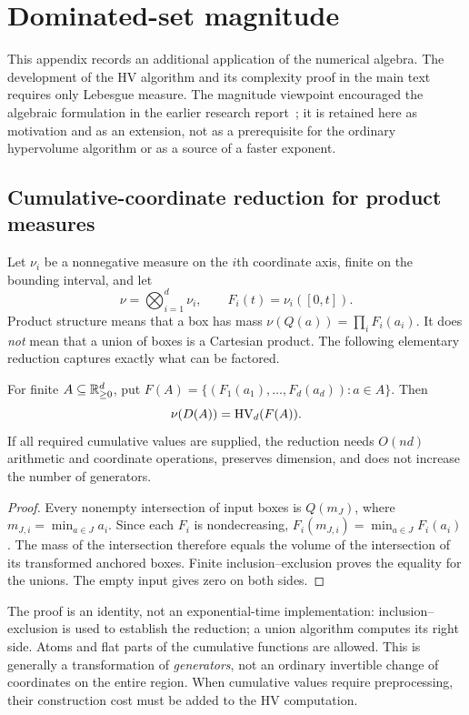 \section{Dominated-set magnitude}
\label{app:magnitude}

This appendix records an additional application of the numerical algebra.
The development of the HV algorithm and its complexity proof in the main
text requires only Lebesgue measure. The magnitude viewpoint encouraged
the algebraic formulation in the earlier research report~\cite{magnitudesoftware};
it is retained here as motivation and as an extension, not as a prerequisite
for the ordinary hypervolume algorithm or as a source of a faster exponent.

\subsection{Cumulative-coordinate reduction for product measures}
Let $\nu_i$ be a nonnegative measure on the $i$th coordinate axis, finite
on the bounding interval, and let
\[
 \nu=\bigotimes_{i=1}^d\nu_i,
 \qquad F_i(t)=\nu_i([0,t]).
\]
Product structure means that a box has mass
$\nu(Q(a))=\prod_iF_i(a_i)$. It does \emph{not} mean that a union of boxes
is a Cartesian product. The following elementary reduction captures
exactly what can be factored.

\begin{proposition}\label{prop:cdf}
For finite $A\subseteq\mathbb R_{\ge0}^d$, put
$F(A)=\{(F_1(a_1),\ldots,F_d(a_d)):a\in A\}$. Then
\[
                  \nu(D(A))=\operatorname{HV}_d(F(A)).
\]
If all required cumulative values are supplied, the reduction needs
$O(nd)$ arithmetic and coordinate operations, preserves dimension, and
does not increase the number of generators.
\end{proposition}
\begin{proof}
Every nonempty intersection of input boxes is $Q(m_J)$, where
$m_{J,i}=\min_{a\in J}a_i$. Since each $F_i$ is nondecreasing,
$F_i(m_{J,i})=\min_{a\in J}F_i(a_i)$. The mass of the intersection
therefore equals the volume of the intersection of its transformed
anchored boxes. Finite inclusion--exclusion proves the equality for the
unions. The empty input gives zero on both sides.
\end{proof}

The proof is an identity, not an exponential-time implementation:
inclusion--exclusion is used to establish the reduction; a union algorithm
computes its right side. Atoms and flat parts of the cumulative functions
are allowed. This is generally a transformation of \emph{generators},
not an ordinary invertible change of coordinates on the entire region.
When cumulative values require preprocessing, their construction cost
must be added to the HV computation.

